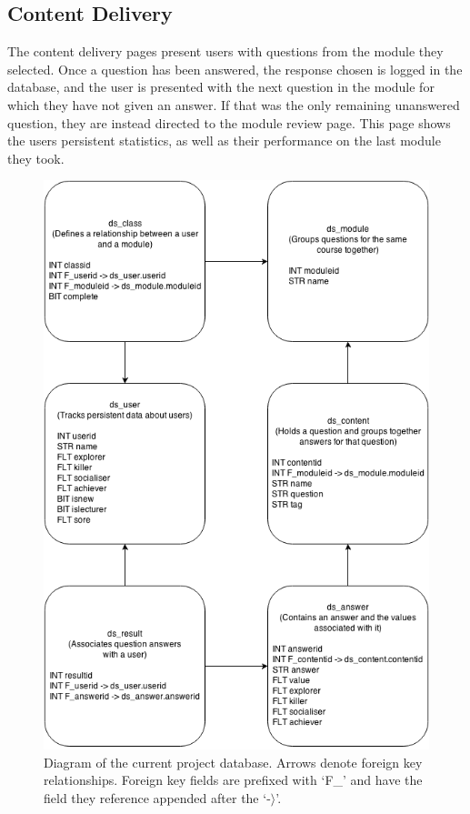 \documentclass[10pt,a4paper]{report}
\begin{document}
\subsection*{Content Delivery}
The content delivery pages present users with questions from the module they selected. Once a question has been answered, the response chosen is logged in the database, and the user is presented with the next question in the module for which they have not given an answer. If that was the only remaining unanswered question, they are instead directed to the module review page. This page shows the users persistent statistics, as well as their performance on the last module they took.

\begin{figure}
	\includegraphics[width=\textwidth]{../img/database.png}
	\caption{Diagram of the current project database. Arrows denote foreign key relationships. Foreign key fields are prefixed with `F\_' and have the field they reference appended after the `-$\rangle$'.}
	\label{db}
\end{figure}
\end{document}

